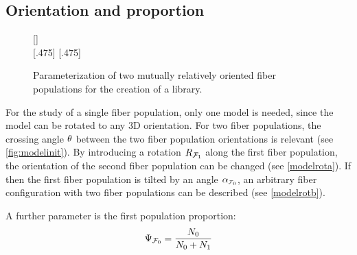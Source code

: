 \subsection{Orientation and proportion}\label{sec:modelParamet}
%
\begin{figure}[t]
\centering
\setlength{\tikzwidth}{0.40\textwidth}
[\textwidth]{}
\\
%
[.475\textwidth]{}\hfill
{}
[.475\textwidth]{}
\caption{Parameterization of two mutually relatively oriented fiber populations for the creation of a library.}
\label{fig:twomodelpopdesign}
\end{figure}
%
For the study of a single fiber population, only one model is needed, since the model can be rotated to any 3D orientation. 
For two fiber populations, the crossing angle $\textnormal{$\theta$}$ between the two fiber population orientations is relevant (see \cref{fig:modelinit}).
By introducing a rotation $\textnormal{$R_{\textnormal{$\mathcal{F}_1$}}$}$ along the first fiber population, the orientation of the second fiber population can be changed (see \cref{modelrota}).
If then the first fiber population is tilted by an angle $\modelInc$, an arbitrary fiber configuration with two fiber populations can be described (see \cref{modelrotb}).
\par
% 
A further parameter is the first population proportion:
\begin{align}
    \textnormal{$\Psi_{\textnormal{$\mathcal{F}_0$}}$}=\frac{N_0}{N_0+N_1}
\end{align}
